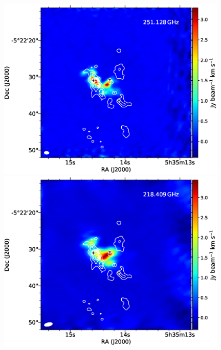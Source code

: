 \begin{figure}[H]
\begin{center}
\begin{minipage}{0.98\textwidth} 
\begin{center}
\begin{minipage}{0.48\textwidth}
\begin{center}
\includegraphics[width=0.98\textwidth]{OrionKL/mom0/251.128mom0_3-7.eps}
\end{center}
\end{minipage}
\begin{minipage}{0.48\textwidth}
\begin{center}
\includegraphics[width=0.98\textwidth]{OrionKL/mom0/218.409mom0_3-7.eps}
\end{center}
\end{minipage}
\end{center}
\end{minipage}


\end{center}
\end{figure}
